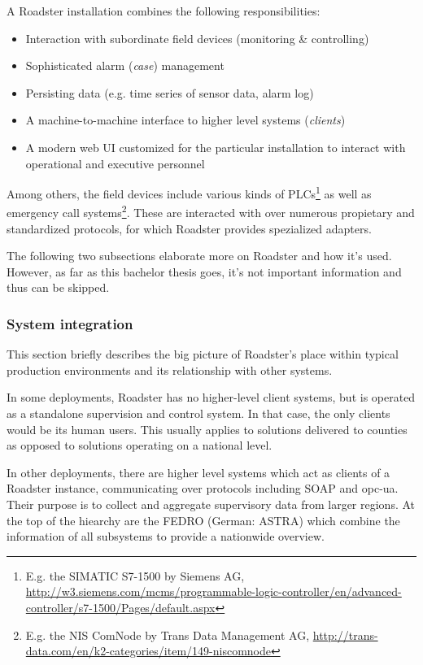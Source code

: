 A Roadster installation combines the following responsibilities:

\begin{itemize}
	\item Interaction with subordinate field devices (monitoring \& controlling)
	\item Sophisticated alarm (\emph{case}) management
	\item Persisting data (e.g. time series of sensor data, alarm log)
	\item A machine-to-machine interface to higher level systems (\emph{clients})
	\item A modern web UI customized for the particular installation to interact with operational and executive personnel
\end{itemize}

Among others, the field devices include various kinds of \glspl{PLC}\footnote{E.g.
the SIMATIC S7-1500 by Siemens AG,
\url{http://w3.siemens.com/mcms/programmable-logic-controller/en/advanced-controller/s7-1500/Pages/default.aspx}}
as well as emergency call systems\footnote{E.g. the NIS ComNode by Trans Data
Management AG,
\url{http://trans-data.com/en/k2-categories/item/149-niscomnode}}.
These are interacted with over numerous propietary and standardized protocols,
for which Roadster provides spezialized adapters.

The following two subsections elaborate more on Roadster and how it's used.
However, as far as this bachelor thesis goes, it's not important information
and thus can be skipped.

\subsubsection{System integration}\label{sec:scope:sys-integration}
This section briefly describes the big picture of Roadster's place within
typical production environments and its relationship with other systems.

In some deployments, Roadster has no higher-level client systems, but is
operated as a standalone supervision and control system. In that case, the only
clients would be its human users. This usually applies to solutions delivered
to counties as opposed to solutions operating on a national level.

In other deployments, there are higher level systems which act as clients of a Roadster instance, communicating over
protocols including \gls{SOAP} and \gls{opc-ua}. Their purpose is to
collect and aggregate supervisory data from larger regions. At the top of the
hiearchy are the \gls{FEDRO} (German: \gls{ASTRA}) which combine the information of all
subsystems to provide a nationwide overview.

